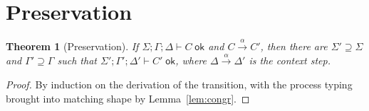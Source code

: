 \documentclass[11pt,openany]{book}
\newtheorem{theorem}{Theorem}[chapter]
\theoremstyle{remark}
\begin{document}
\section{Preservation}

\begin{theorem}[Preservation]\label{thm:sr}
If $\Sigma;\Gamma;\Delta\vdash C\;\mathsf{ok}$ and
$C\xrightarrow{\alpha}C'$, then there are $\Sigma'\supseteq\Sigma$ and
$\Gamma'\supseteq\Gamma$ such that
$\Sigma';\Gamma';\Delta'\vdash C'\;\mathsf{ok}$, where
$\Delta\xrightarrow{\alpha}\Delta'$ is the context step.
\end{theorem}

\begin{proof}
By induction on the derivation of the transition, with the process
typing brought into matching shape by Lemma~\ref{lem:congr}.


\end{proof}
\end{document}
